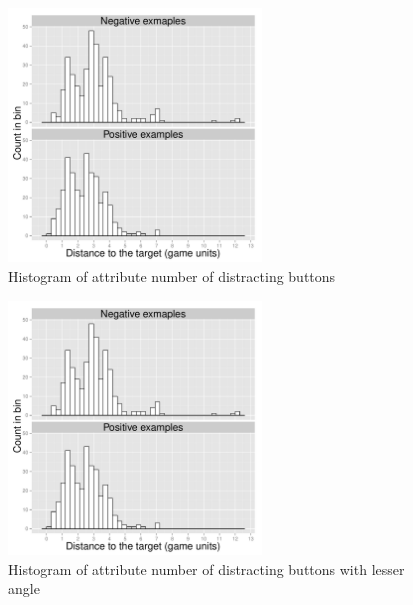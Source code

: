 \begin{figure}[!htbp]
  \centering
	\includegraphics[page=5,width=0.6\textwidth]{Images/fref_distrib}
	\caption{Histogram of attribute number of distracting buttons}
	\label{fig:fref-distrib-distbuttons}
\end{figure}

\begin{figure}[!htbp]
  \centering
	\includegraphics[page=6,width=0.6\textwidth]{Images/fref_distrib}
	\caption{Histogram of attribute number of distracting buttons with lesser angle}
	\label{fig:fref-distrib-distangles}
\end{figure}

\FloatBarrier

